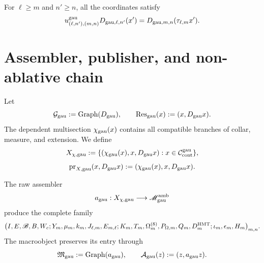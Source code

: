For \(\ell\ge m\) and \(n'\ge n\), all the coordinates satisfy
\begin{equation}\label{eq:gauint-naturalidad-trece}
 u^{\rm gau}_{(\ell,n'),(m,n)}D_{{\rm gau},\ell,n'}(x')
 =D_{{\rm gau},m,n}(\tau_{\ell,m}x').
\end{equation}

\section{Assembler, publisher, and non-ablative chain}

Let
\begin{equation}\label{eq:gauint-graph-d}
 \mathcal G_{\rm gau}:=\operatorname{Graph}(D_{\rm gau}),
 \qquad
 \operatorname{Res}_{\rm gau}(x):=(x,D_{\rm gau}x).
\end{equation}
The dependent multisection \(\chi_{\rm gau}(x)\) contains all compatible branches
of collar, measure, and extension. We define
\begin{equation}\label{eq:gauint-x-dependiente}
 X_{\chi,{\rm gau}}
 :=\{(\chi_{\rm gau}(x),x,D_{\rm gau}x):
 x\in\mathcal C_{\rm cont}^{\rm gau}\},
\end{equation}
\begin{equation}\label{eq:gauint-prx}
 \operatorname{pr}_{X,{\rm gau}}(x,D_{\rm gau}x)
 :=(\chi_{\rm gau}(x),x,D_{\rm gau}x).
\end{equation}

The raw assembler
\begin{equation}\label{eq:gauint-ensamblador-crudo}
 a_{\rm gau}:X_{\chi,{\rm gau}}\longrightarrow
 \mathscr M_{\rm gau}^{\rm amb}
\end{equation}
produce the complete family
\[
 \bigl(I,E,\mathscr B,B,W_c;
 Y_m,\mu_m,k_m,J_{\ell,m},E_{m,\ell};
 K_m,T_m,\Omega_m^{(8)},P_{\Omega,m},Q_m,D_m^{\rm HMT};
 \iota_m,\epsilon_m,H_m\bigr)_{m,n}.
\]
The macroobject preserves its entry through
\begin{equation}\label{eq:gauint-graph-a}
 \mathfrak M_{\rm gau}:=\operatorname{Graph}(a_{\rm gau}),
 \qquad
 \mathcal A_{\rm gau}(z):=(z,a_{\rm gau}z).
\end{equation}

